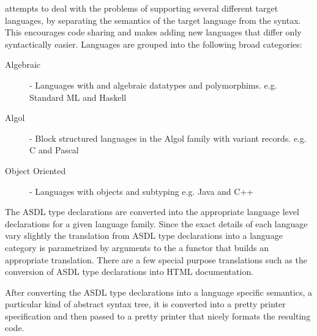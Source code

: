 \asdlGen attempts to deal with the problems of supporting several different
target languages, by separating the semantics of the target language from
the syntax. This encourages code sharing and makes adding new languages that
differ only syntactically easier. Languages are grouped into the following
broad categories:
\begin{description}
\item[Algebraic] - Languages with and algebraic datatypes and
polymorphims. e.g. Standard ML and Haskell
\item[Algol] - Block structured languages in the Algol family with
variant records. e.g. C and Pascal
\item[Object Oriented] - Languages with objects and subtyping e.g. Java and
C++
\end{description}
The ASDL type declarations are converted into the appropriate language level
declarations for a given language family. Since the exact details of each
language vary slightly the translation from ASDL type declarations into a
language category is parametrized by arguments to the a functor that builds
an appropriate translation. There are a few special purpose translations such
as the conversion of ASDL type declarations into HTML documentation.

After converting the ASDL type declarations into a language specific
semantics, a particular kind of abstract syntax tree, it is converted into a
pretty printer specification and then passed to a pretty printer that nicely
formats the resulting code.
 




